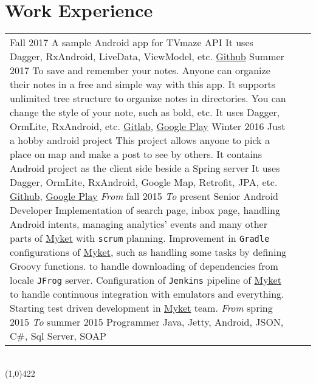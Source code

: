 \documentclass[10pt]{article}
\newcommand\HRule{\hspace*{.8cm}\line(1,0){422}\\}
\newenvironment{Record}[1]
{
    \vspace{-0.5cm}
    \section*{#1}
        \vspace{0.1cm}
        \begin{tabular}
}
{
        \end{tabular}\\
        \HRule
}
\begin{document}
\begin{Record}{Work Experience}{l l l}
    \WorkExperience{TV Maze Sample}
        {Fall 2017}{}
        {A sample Android app for TVmaze API}
        {It uses Dagger, RxAndroid, LiveData, ViewModel, etc.}
        {\href{https://github.com/hadilq/TvMazeSample}{Github}}%
        {}{}{}%
    \WorkExperience{Note Taking}
        {Summer 2017}{}
        {To save and remember your notes. Anyone can organize their notes in}
        {a free and simple way with this app.}
        {It supports unlimited tree structure to organize notes in directories.}
        {You can change the style of your note, such as bold, etc.}
        {It uses Dagger, OrmLite, RxAndroid, etc.}
        {\href{https://gitlab.com/hadilq/NoteTaking}{Gitlab}, \href{https://play.google.com/store/apps/details?id=com.gitlab.notetaking}{Google Play}}%
    \WorkExperience{Free Map}
        {Winter 2016}{}
        {Just a hobby android project}
        {This project allows anyone to pick a place on map and make }
        {a post to see by others.}
        {It contains Android project as the client side beside a Spring server}
        {It uses Dagger, OrmLite, RxAndroid, Google Map, Retrofit, JPA, etc.}
        {\href{https://github.com/hadilq/HobbyTaste}{Github}, \href{https://play.google.com/store/apps/details?id=ir.asparsa.hobbytaste}{Google Play}}%
    \WorkExperience{\href{http://hasintech.com}{Hasin Technology}}
        {\scriptsize\textit{From} fall 2015}
        {\scriptsize\textit{To} present}
        {Senior Android Developer}
        {Implementation of search page, inbox page, }
        {handling Android intents, managing analytics' events}
        {and many other parts of \href{http://myket.ir}{Myket} with \scriptsize{\texttt{scrum}} planning.}
        {Improvement in \texttt{Gradle} configurations of \href{http://myket.ir}{Myket},}
        {such as handling some tasks by defining Groovy functions.}%
    \WorkExperienceHasinOne{Improvement in \texttt{Maven} configurations of \href{http://myket.ir}{Myket}}
        {to handle downloading of dependencies from locale \scriptsize{\texttt{JFrog}} server.}
        {Configuration of \scriptsize{\texttt{Jenkins}} pipeline of \href{http://myket.ir}{Myket}}
        {to handle continuous integration with emulators and everything.}
        {Starting test driven development in \href{http://myket.ir}{Myket} team.}%
    \WorkExperience{\href{http://sohasys.ir}{Soha Company}}
        {\scriptsize\textit{From} spring 2015}
        {\scriptsize\textit{To} summer 2015}
        {Programmer}
        {Java, Jetty, Android, JSON, C\#, Sql Server, SOAP}

\end{Record}
\end{document}
